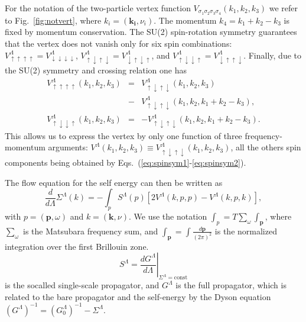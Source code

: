 For the notation of the two-particle vertex function $V_{\sigma_1\sigma_2\sigma_3\sigma_4}(k_1,k_2,k_3)$ we refer to Fig.~\ref{fig:notvert}, where $k_i=(\mathbf{k_i},\nu_i)$.
The momentum $k_4=k_1+k_2-k_3$ is fixed by momentum conservation.
The SU(2) spin-rotation symmetry guarantees that the vertex does not vanish only for six spin combinations:
$V^\Lambda_{\uparrow\uparrow\uparrow\uparrow} =
 V^\Lambda_{\downarrow\downarrow\downarrow\downarrow}$, 
$V^\Lambda_{\uparrow\downarrow\uparrow\downarrow} =
 V^\Lambda_{\downarrow\uparrow\downarrow\uparrow}$, and
$V^\Lambda_{\uparrow\downarrow\downarrow\uparrow } =
 V^\Lambda_{\downarrow\uparrow\uparrow\downarrow}$.   
Finally, due to the SU(2) symmetry and crossing relation one has \cite{Rohringer2012} 
\begin{eqnarray}
\nonumber
V^\Lambda_{\uparrow\uparrow\uparrow\uparrow}(k_1,k_2,k_3) &=& V^\Lambda_{\uparrow\downarrow\uparrow\downarrow}(k_1,k_2,k_3)\\&-& V^\Lambda_{\uparrow\downarrow\uparrow\downarrow}(k_1,k_2,k_1+k_2-k_3),
\label{eq:spinsym1}
 \\ 
V^\Lambda_{\uparrow\downarrow\downarrow\uparrow}(k_1,k_2,k_3)& =& -V^\Lambda_{\uparrow\downarrow\uparrow\downarrow}(k_1,k_2,k_1+k_2-k_3).
\label{eq:spinsym2}
\end{eqnarray}
This allows us to express the vertex by only one function of three frequency-momentum arguments: $V^\Lambda(k_1,k_2,k_3)\equiv V^\Lambda_{\uparrow\downarrow\uparrow\downarrow}(k_1,k_2,k_3)$, all the others spin components being obtained by Eqs.~(\ref{eq:spinsym1}-\ref{eq:spinsym2}).\cite{Husemann2009}

The flow equation for the self energy can then be written as \cite{Metzner2012} 
\begin{equation}
\frac{d}{d \Lambda} \Sigma^\Lambda(k)= -\int_p  S^\Lambda(p)\left[2V^\Lambda(k,p,p) -V^\Lambda(k,p,k)\right], 
\end{equation}
with $p=(\mathbf{p},\omega)$ and $k = (\mathbf{k},\nu)$.
We use the notation  $\int_{p} = T \sum_\omega \int_{\mathbf{p}}$, where $\sum_\omega$ is the Matsubara frequency sum, and $\int_{\mathbf{p}}=\int  \frac{d\mathbf{p}}{(2\pi)^2}$ is the normalized integration over the first Brillouin zone. 
\begin{equation}
 S^\Lambda = \left. \frac{dG^\Lambda}{d\Lambda}\right|_{\Sigma^{\Lambda}=\mathrm{const}} 
\end{equation}
is the socalled single-scale propagator, and ${G^\Lambda}$ is the full propagator, which is related to the bare propagator and the self-energy by the Dyson equation
$(G^\Lambda)^{-1} = (G_0^\Lambda)^{-1} - \Sigma^\Lambda$. 
  
